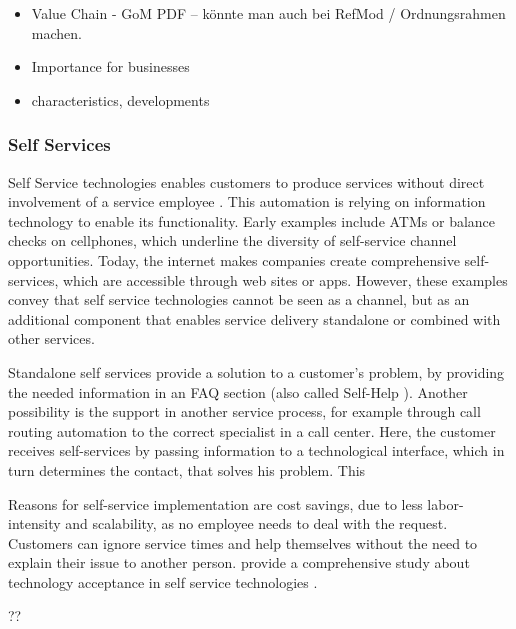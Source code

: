 				
				\begin{itemize}
		
			\item Value Chain - GoM PDF -- könnte man auch bei RefMod / Ordnungsrahmen machen. 			
			\item Importance for businesses
			\item characteristics, developments 
		\end{itemize}
	
	\subsubsection{Self Services}
	\label{sec:ss}
		Self Service technologies enables customers to produce services without direct involvement of a service employee \citep{meuter2000self}. This automation is relying on information technology to enable its functionality. Early examples include ATMs or balance checks on cellphones, which underline the diversity of self-service channel opportunities. Today, the internet makes companies create comprehensive self-services, which are accessible through web sites or apps. However, these examples convey that self service technologies cannot be seen as a channel, but as an additional component that enables service delivery standalone or combined with other services. 
		
		Standalone self services provide a solution to a customer's problem, \ie by providing the needed information in an \acrshort{FAQ} section (also called Self-Help \citep{meuter2000self}). Another possibility is the support in another service process, for example through call routing automation to the correct specialist in a call center. Here, the customer receives self-services by passing information to a technological interface, which in turn determines the contact, that solves his problem. This 
		
		Reasons for self-service implementation are cost savings, due to less labor-intensity and scalability, as no employee needs to deal with the request. Customers can ignore service times and help themselves without the need to explain their issue to another person. \citeauthor{Blut_2016} provide a comprehensive study about technology acceptance in self service technologies \citep{Blut_2016}. 
		
		??
		
		
